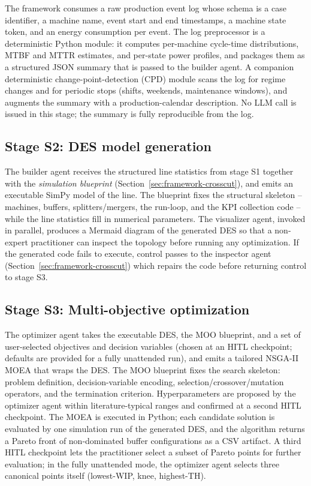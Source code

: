 \documentclass[a4paper,fleqn]{cas-sc}
\begin{document}
  The framework consumes a raw production event log whose schema is a case identifier, a machine name, event start and  
  end timestamps, a machine state token, and an energy consumption per event. The log preprocessor is a deterministic
  Python module: it computes per-machine cycle-time distributions, MTBF and MTTR estimates, and per-state power         
  profiles, and packages them as a structured JSON summary that is passed to the builder agent. A companion
  deterministic change-point-detection (CPD) module scans the log for regime changes and for periodic stops (shifts,
  weekends, maintenance windows), and augments the summary with a production-calendar description. No LLM call is issued
   in this stage; the summary is fully reproducible from the log.

  \subsection{Stage S2: DES model generation}\label{sec:framework-s2}                                                   
   
  The builder agent receives the structured line statistics from stage S1 together with the \emph{simulation blueprint} 
  (Section~\ref{sec:framework-crosscut}), and emits an executable SimPy model of the line. The blueprint fixes the
  structural skeleton -- machines, buffers, splitters/mergers, the run-loop, and the KPI collection code -- while the   
  line statistics fill in numerical parameters. The visualizer agent, invoked in parallel, produces a Mermaid diagram of
   the generated DES so that a non-expert practitioner can inspect the topology before running any optimization. If the
  generated code fails to execute, control passes to the inspector agent (Section~\ref{sec:framework-crosscut}) which
  repairs the code before returning control to stage S3.

  \subsection{Stage S3: Multi-objective optimization}\label{sec:framework-s3}                                           
   
  The optimizer agent takes the executable DES, the MOO blueprint, and a set of user-selected objectives and decision   
  variables (chosen at an HITL checkpoint; defaults are provided for a fully unattended run), and emits a tailored
  NSGA-II MOEA that wraps the DES. The MOO blueprint fixes the search skeleton: problem definition, decision-variable   
  encoding, selection/crossover/mutation operators, and the termination criterion. Hyperparameters are proposed by the
  optimizer agent within literature-typical ranges and confirmed at a second HITL checkpoint. The MOEA is executed in
  Python; each candidate solution is evaluated by one simulation run of the generated DES, and the algorithm returns a
  Pareto front of non-dominated buffer configurations as a CSV artifact. A third HITL checkpoint lets the practitioner
  select a subset of Pareto points for further evaluation; in the fully unattended mode, the optimizer agent selects
  three canonical points itself (lowest-WIP, knee, highest-TH).
\end{document}
